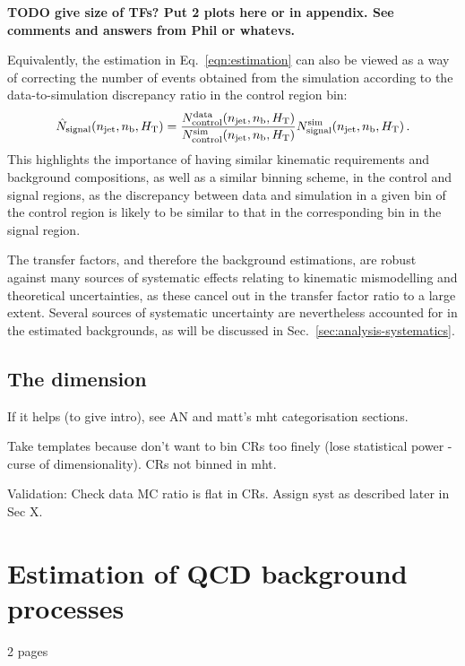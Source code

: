 \textbf{TODO give size of TFs? Put 2 plots here or in appendix. See comments 
and answers from Phil or whatevs.}

Equivalently, the estimation in Eq.~\ref{eqn:estimation} can also be viewed as 
a way of correcting the number of events obtained from the simulation according 
to the data-to-simulation discrepancy ratio in the control region bin:
\begin{equation}
\hat{N}_\mathrm{signal}(n_{\text{jet}}, n_{\text{b}}, \mbox{$H_\text{T}$}) = 
\frac{N_\mathrm{control}^\mathrm{data}(n_{\text{jet}}, n_{\text{b}}, \mbox{$H_\text{T}$})}{N_\mathrm{control}^\mathrm{sim}(n_{\text{jet}}, n_{\text{b}}, \mbox{$H_\text{T}$})}
N_\mathrm{signal}^\mathrm{sim}(n_{\text{jet}}, n_{\text{b}}, \mbox{$H_\text{T}$}) \, .
\end{equation}
This highlights the importance of having similar kinematic requirements and 
background compositions, as well as a similar binning scheme, in the control 
and signal regions, as the discrepancy between data and simulation in a given 
bin of the control region is likely to be similar to that in the corresponding 
bin in the signal region.

The transfer factors, and therefore the background estimations, are robust 
against many sources of systematic effects relating to kinematic mismodelling 
and theoretical uncertainties, 
as these cancel out in the transfer factor ratio to a large extent.
Several sources of systematic uncertainty are nevertheless accounted for in the 
estimated backgrounds, as will be discussed in 
Sec.~\ref{sec:analysis-systematics}.

\subsection{The \mht dimension}
\label{sec:analysis-estimation-mht}

If it helps (to give intro), see AN and matt's mht categorisation sections.

Take templates because don't want to bin CRs too finely (lose statistical power 
- curse of dimensionality).
CRs not binned in mht.

Validation: Check data MC ratio is flat in CRs. Assign syst as described later 
in Sec X.

\section{Estimation of QCD background processes}
\label{sec:analysis-estimation-qcd}
2 pages

